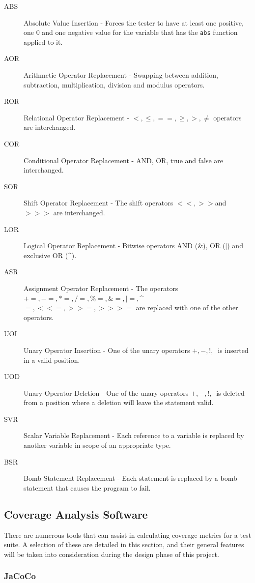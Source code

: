 \begin{description}
\item[ABS] Absolute Value Insertion - Forces the tester to have at least one positive, one 0 and one negative value for the variable that has the \verb+abs+ function applied to it.
\item[AOR] Arithmetic Operator Replacement - Swapping between addition, subtraction, multiplication, division and modulus operators.
\item[ROR] Relational Operator Replacement - $<, \leq, ==, \geq, >, \neq$ operators are interchanged.
\item[COR] Conditional Operator Replacement - AND, OR, true and false are interchanged.
\item [SOR] Shift Operator Replacement - The shift operators $<<, >> $and $>>>$ are interchanged.
\item[LOR] Logical Operator Replacement - Bitwise operators AND (\&), OR ($\mid$) and exclusive OR (\^{}).
\item[ASR] Assignment Operator Replacement - The operators $+=, -=, *=, /=, \%=, \&=, |=, $\^{}$=, <<=, >>=, >>>=$ are replaced with one of the other operators.
\item[UOI] Unary Operator Insertion - One of the unary operators $+, -, !, ~ $ is inserted in a valid position.
\item[UOD] Unary Operator Deletion - One of the unary operators $+, -, !, ~ $ is deleted from a position where a deletion will leave the statement valid.
\item[SVR] Scalar Variable Replacement - Each reference to a variable is replaced by another variable in scope of an appropriate type.
\item[BSR] Bomb Statement Replacement - Each statement is replaced by a bomb statement that causes the program to fail.
\end{description}

\subsection{Coverage Analysis Software}

There are numerous tools that can assist in calculating coverage metrics for a test suite. A selection of these are detailed in this section, and their general features will be taken into consideration during the design phase of this project.

\subsubsection{JaCoCo}

